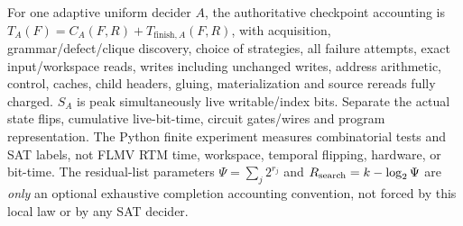 \documentclass[11pt]{article}
\begin{document}
For one adaptive uniform decider $A$, the authoritative checkpoint accounting is $T_A(F)=C_A(F,R)+T_{\mathrm{finish},A}(F,R)$, with acquisition, grammar/defect/clique discovery, choice of strategies, all failure attempts, exact input/workspace reads, writes including unchanged writes, address arithmetic, control, caches, child headers, gluing, materialization and source rereads fully charged. $S_A$ is peak simultaneously live writable/index bits. Separate the actual state flips, cumulative live-bit-time, circuit gates/wires and program representation. The Python finite experiment measures combinatorial tests and SAT labels, not FLMV RTM time, workspace, temporal flipping, hardware, or bit-time. The residual-list parameters $\Psi=\sum_j2^{r_j}$ and $R_{\rm search}=k-\log_2\Psi$ are \emph{only} an optional exhaustive completion accounting convention, not forced by this local law or by any SAT decider.
\end{document}
